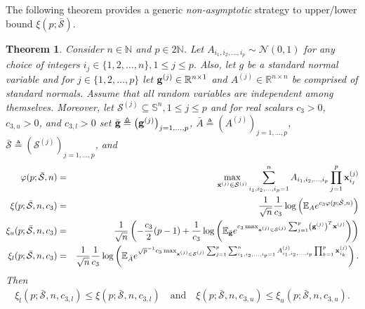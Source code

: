 \documentclass[10pt]{article}
\def\x{{\bf x}}
\def\x{{\mathbf x}}
\def\x{{\bf x}}
\def\x{{\bf x}}
\def\g{{\bf g}}
\def\mR{{\mathbb R}}
\def\mN{{\mathbb N}}
\def\mE{{\mathbb E}}
\def\mS{{\mathbb S}}
\def\lp{\left (}
\def\rp{\right )}
\def\x{{\bf x}}
\def\x{{\mathbf x}}
\def\x{{\bf x}}
\def\x{{\bf x}}
\def\g{{\bf g}}
\def\cS{{\mathcal S}}
\def\cN{{\mathcal N}}
\def\bcS{\bar{\mathcal S}}
\newtheorem{theorem}{Theorem}
\begin{document}
The following theorem provides a generic \emph{non-asymptotic} strategy to upper/lower bound $\xi(p;\bcS) $.

\begin{theorem}
\label{thm:thm1}
  Consider  $n\in\mN$ and  $p\in 2\mN$. Let $A_{i_1,i_2,\dots,i_p}\sim \cN(0,1)$ for any choice of integers $i_j\in\{1,2,\dots,n\},1\leq j \leq p$. Also, let $g$ be a standard normal variable and for $j\in\{1,2,\dots,p\}$ let $\g^{(j)}\in \mR^{n\times 1}$ and $A^{(j)}\in \mR^{n\times n}$ be comprised of standard normals. Assume that all random variables are independent among themselves. Moreover, let $\cS^{(j)}\subseteq\mS^n, 1\leq j\leq p$ and for real scalars $c_3>0$, $c_{3,u}>0$, and $c_{3,l}>0$  set $\bar{\g}\triangleq\lp \g^{(j)}\rp_{j=1,\dots,p}$, $\bar{A}\triangleq\lp A^{(j)}\rp_{j=1,\dots,p}$, $\bcS\triangleq\lp \cS^{(j)}\rp_{j=1,\dots,p}$, and
  \begin{eqnarray}
   \label{eq:thm1eq1}
\varphi(p;\bcS,n) & = &  \max_{\x^{(j)}\in\cS^{(j)}} \sum_{i_1,i_2,\dots,i_p=1}^n A_{i_1,i_2,\dots,i_p}\prod_{j=1}^{p}\x_{i_j}^{(j)} \nonumber \\
\xi(p;\bcS,n,c_3) & = &  \frac{1}{\sqrt{n}} \frac{1}{c_3}\log \lp  \mE_A e^{c_3 \varphi(p;\bcS,n) } \rp \nonumber \\
\xi_u(p;\bcS,n,c_3) & = & \frac{1}{\sqrt{n}} \lp -\frac{c_{3}}{2}(p-1)  + \frac{1}{c_{3}} \log\lp  \mE_{\bar{\g}} e^{c_{3}\max_{\x^{(j)}\in\cS^{(j)}} \sum_{j=1}^p \lp\g^{(j)}\rp^T\x^{(j)} } \rp \rp
\nonumber \\
\xi_l(p;\bcS,n,c_3) & = &   \frac{1}{\sqrt{ n}} \frac{1}{c_{3}} \log \lp \mE_{\bar{A}} e^{ \sqrt{p}^{-1}c_{3} \max_{\x^{(j)}\in\cS^{(j)}} \sum_{j=1}^p \sum_{i_1,i_2,\dots,i_p=1}^n A^{(j)}_{i_1,i_2,\dots,i_p}\prod_{k=1}^{p}\x_{i_k}^{(j)}
 } \rp.
 \end{eqnarray}
Then
\begin{eqnarray}
   \label{eq:thm1eq2}
\xi_l(p;\bcS,n,c_{3,l})  \leq \xi(p;\bcS,n,c_{3,l}) \quad \mbox{and} \quad  \xi(p;\bcS,n,c_{3,u})   \leq  \xi_u(p;\bcS,n,c_{3,u}).
\end{eqnarray}
\end{theorem}
\end{document}
